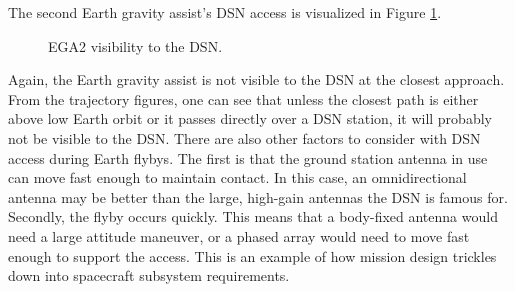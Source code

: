 \documentclass[]{aiaa-tc}%
\begin{document}
The second Earth gravity assist's DSN access is visualized in Figure \ref{fig:EGA2_Access}.
	\begin{figure}[H]
		\centering
		\caption{EGA2 visibility to the DSN. }
		\label{fig:EGA2_Access}
	\end{figure}	

Again, the Earth gravity assist is not visible to the DSN at the closest approach. From the trajectory figures, one can see that unless the closest path is either above low Earth orbit or it passes directly over a DSN station, it will probably not be visible to the DSN. There are also other factors to consider with DSN access during Earth flybys. The first is that the ground station antenna in use can move fast enough to maintain contact. In this case, an omnidirectional antenna may be better than the large, high-gain antennas the DSN is famous for. Secondly, the flyby occurs quickly. This means that a body-fixed antenna would need a large attitude maneuver, or a phased array would need to move fast enough to support the access. This is an example of how mission design trickles down into spacecraft subsystem requirements.

	\vspace{5 mm}
\end{document}
